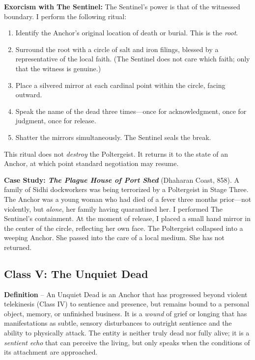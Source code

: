 \textbf{Exorcism with The Sentinel:} The Sentinel's power is that of the witnessed boundary. I perform the following ritual:
\begin{enumerate}
  \item Identify the Anchor's original location of death or burial. This is the \emph{root}.
  \item Surround the root with a circle of salt and iron filings, blessed by a representative of the local faith. (The Sentinel does not care which faith; only that the witness is genuine.)
  \item Place a silvered mirror at each cardinal point within the circle, facing outward.
  \item Speak the name of the dead three times---once for acknowledgment, once for judgment, once for release.
  \item Shatter the mirrors simultaneously. The Sentinel seals the break.
\end{enumerate}
This ritual does not \emph{destroy} the Poltergeist. It returns it to the state of an Anchor, at which point standard negotiation may resume.

\textbf{Case Study: \emph{The Plague House of Port Shed}} (Dhaharan Coast, 858). A family of Sidhi dockworkers was being terrorized by a Poltergeist in Stage Three. The Anchor was a young woman who had died of a fever three months prior---not violently, but \emph{alone}, her family having quarantined her. I performed The Sentinel's containment. At the moment of release, I placed a small hand mirror in the center of the circle, reflecting her own face. The Poltergeist collapsed into a weeping Anchor. She passed into the care of a local medium. She has not returned.

\subsection{Class V: The Unquiet Dead}
\smallskip

\textbf{Definition} -- An Unquiet Dead is an Anchor that has progressed beyond violent telekinesis (Class IV) to sentience and presence, but remains bound to a personal object, memory, or unfinished business. It is a \textit{wound} of grief or longing that has manifestations as subtle, sensory disturbances to outright sentience and the ability to physically attack. The entity is neither truly dead nor fully alive; it is a \textit{sentient echo} that can perceive the living, but only speaks when the conditions of its attachment are approached.


